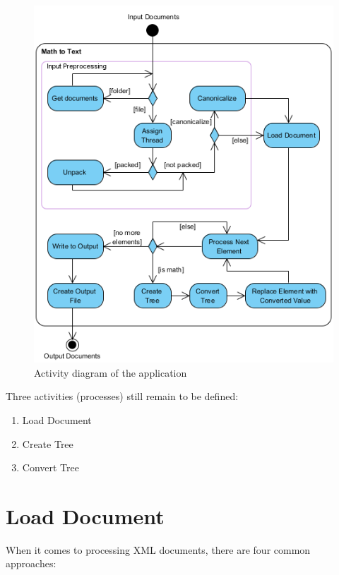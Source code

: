 \documentclass[11pt,oneside,final]{fithesis2}
\begin{document}
\begin{figure}[!ht]
\centering
\includegraphics[width=\textwidth]{activity_diagram_all}
\caption{Activity diagram of the application}
\label{fig:activitydiagramall}
\end{figure}

Three activities (processes) still remain to be defined:
\begin{enumerate}
\item Load Document
\item Create Tree
\item Convert Tree
\end{enumerate}

\section{Load Document}
\label{section:loaddocument}
When it comes to processing XML documents, there are four common approaches:
\end{document}

